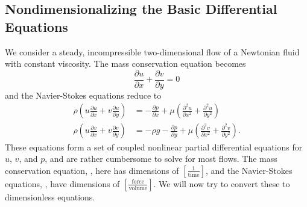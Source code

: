 \subsection{Nondimensionalizing the Basic Differential Equations}
We consider a steady, incompressible two-dimensional flow of a Newtonian fluid with constant viscosity. The mass conservation equation becomes
\begin{equation}\label{eq:masscons2d}
  \frac{\partial u}{\partial x} + \frac{\partial v}{\partial y} = 0
\end{equation}
and the Navier-Stokes equations reduce to
\begin{align} 
  \rho \left( u \frac{\partial u}{\partial x} + v \frac{\partial u}{\partial y}  \right) &= - \frac{\partial p}{\partial x} + \mu \left( \frac{\partial ^2 u}{\partial x^2} + \frac{\partial ^2u}{\partial y^2}  \right) \label{eq:navsto2d1} \\
  \rho \left( u \frac{\partial v}{\partial x} + v \frac{\partial v}{\partial y}  \right) &= - \rho g - \frac{\partial p}{\partial y} + \mu \left( \frac{\partial ^2 v}{\partial x^2} + \frac{\partial^2 v}{\partial y^2}  \right) \label{eq:navsto2d2}
.\end{align}
These equations form a set of coupled nonlinear partial differential equations for $u$, $v$, and $p$, and are rather cumbersome to solve for most flows. The mass conservation equation, , here has dimensions of $\left[ \frac{1}{\text{time}} \right]$, and the Navier-Stokes equations, , have dimensions of $\left[ \frac{\text{force}}{\text{volume}} \right]$. We will now try to convert these to dimensionless equations.

